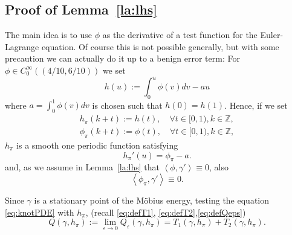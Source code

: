 \subsection{%
Proof of Lemma~\ref{la:lhs}}

The main idea is to use $\phi$ as the derivative of a test function for the 
Euler-Lagrange equation. Of course this is not possible generally, but with some
precaution we can actually do it up to a benign error term:
For $\phi \in C^\infty_0 ((4/10,6/10))$ we set
\begin{equation*}
   h(u):= \int_0^u \phi(v) dv - a u 
\end{equation*}
where $a=\int_0^1 \phi(v) dv$  is chosen such that $ h(0)= h(1)$. 
Hence, if we set
\begin{align*}
h_\pi(k+t) := h(t), \quad \forall t\in [0,1) , k \in \mathbb Z, \\
\phi_\pi(k+t) := \phi(t), \quad \forall t\in [0,1) , k \in \mathbb Z,
\end{align*}
$h_\pi$ is a smooth one periodic function satisfying
\begin{equation*}
    h_\pi'(u) =  \phi_\pi  - a.
\end{equation*}
and, as we assume in Lemma~\ref{la:lhs} that $\left\langle\phi,\gamma'\right\rangle \equiv 0$, also
\begin{equation*}
 \left\langle \phi_\pi , \gamma'\right \rangle \equiv 0.
\end{equation*}

Since $\gamma$ is a stationary point of the M\"obius energy, testing the 
equation \eqref{eq:knotPDE} with $h_\pi$, (recall \eqref{eq:defT1}, \eqref{eq:defT2},\eqref{eq:defQeps}) 
\begin{equation}\label{eq:ourELeqn}
 Q(\gamma,h_\pi) := \lim_{\varepsilon \to 0} Q_\varepsilon(\gamma,h_\pi)
= T_1(\gamma,h_\pi) + T_2(\gamma,h_\pi).
\end{equation}

